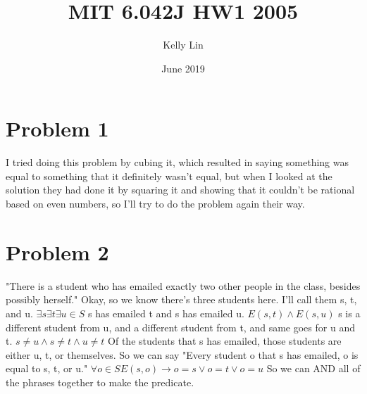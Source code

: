\documentclass{article}
\title{MIT 6.042J HW1 2005}
\author{Kelly Lin }
\date{June 2019}
\begin{document}
\maketitle

\section{Problem 1}

I tried doing this problem by cubing it, which resulted in saying something was equal to something that it definitely wasn't equal, but when I looked at the solution they had done it by squaring it and showing that it couldn't be rational based on even numbers, so I'll try to do the problem again their way. 

\section{Problem 2}
"There is a student who has emailed exactly two other people in the class, besides possibly herself."
Okay, so we know there's three students here. I'll call them s, t, and u. 
\hfill \break
$ \exists s \exists t \exists u \in S $
\hfill \break
s has emailed t and s has emailed u.
\hfill \break
$E(s,t) \wedge E(s,u)$
\hfill \break
s is a different student from u, and a different student from t, and same goes for u and t. 
\hfill \break
$s \neq u \wedge s \neq t \wedge u \neq t$
\hfill \break
Of the students that s has emailed, those students are either u, t, or themselves. So we can say "Every student o that s has emailed, o is equal to s, t, or u."
$\forall o \in S E(s, o) \rightarrow o = s \vee o = t \vee o = u$
So we can AND all of the phrases together to make the predicate. 
\end{document}
